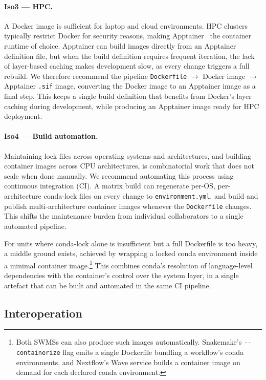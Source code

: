 \documentclass{eceasst}
\begin{document}
\paragraph{Iso3 --- HPC.}
A Docker image is sufficient for laptop and cloud environments. HPC clusters
typically restrict Docker for security reasons, making
Apptainer~\cite{kurtzer2017singularity} the container runtime of
choice. Apptainer can build images directly from an
Apptainer definition file, but when the build definition requires frequent
iteration, the lack of layer-based caching makes development slow, as every change
triggers a full rebuild. We therefore recommend
the pipeline \texttt{Dockerfile} $\to$ Docker image $\to$ Apptainer \texttt{.sif} image, converting the Docker image to an Apptainer image as a final
step. This keeps a single build definition that benefits from Docker's layer
caching during development, while producing an Apptainer image ready for HPC
deployment.


\paragraph{Iso4 --- Build automation.}
Maintaining lock files across operating systems and architectures, and building
container images across CPU architectures, is combinatorial work that does not
scale when done manually. We recommend automating this process using continuous
integration (CI). A matrix build can regenerate per-OS, per-architecture conda-lock
files on every change to \texttt{environment.yml}, and build and publish
multi-architecture container images whenever the \texttt{Dockerfile} changes.
This shifts the maintenance burden from individual collaborators to a single
automated pipeline.

For units where conda-lock alone is insufficient but a full Dockerfile is too
heavy, a middle ground exists, achieved by wrapping a locked conda environment inside
a minimal container image.\footnote{Both SWMSs can also produce such images
automatically. Snakemake's \texttt{-{}-containerize} flag emits a single Dockerfile
bundling a workflow's conda environments, and Nextflow's Wave service builds a
container image on demand for each declared conda environment.} This combines conda's resolution of language-level
dependencies with the container's control over the system layer, in a single
artefact that can be built and automated in the same CI pipeline.

\subsection{Interoperation}
\label{sec:interoperation}
\end{document}
